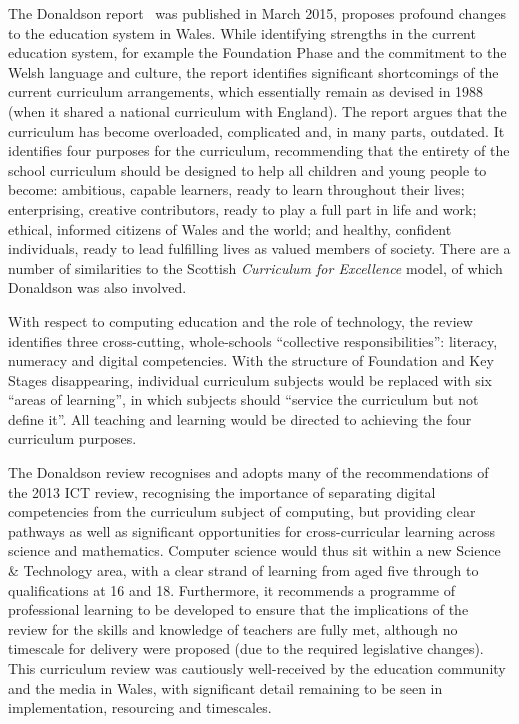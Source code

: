 \documentclass[conference]{IEEEtran}
\begin{document}
The Donaldson report~\cite{Donaldson:2015} was published in March 2015, proposes
profound changes to the education system in Wales. While identifying
strengths in the current education system, for example the Foundation
Phase and the commitment to the Welsh language and culture, the report
identifies significant shortcomings of the current curriculum
arrangements, which essentially remain as devised in 1988 (when it
shared a national curriculum with England). The report argues that the
curriculum has become overloaded, complicated and, in many parts,
outdated. It identifies four purposes for the curriculum, recommending
that the entirety of the school curriculum should be designed to help
all children and young people to become: ambitious, capable learners,
ready to learn throughout their lives; enterprising, creative
contributors, ready to play a full part in life and work; ethical,
informed citizens of Wales and the world; and healthy, confident
individuals, ready to lead fulfilling lives as valued members of
society. There are a number of similarities to the Scottish
{\emph{Curriculum for Excellence}}
model, %
of which Donaldson was also involved.

With respect to computing education and
the role of technology, the review identifies three cross-cutting,
whole-schools ``collective
responsibilities'': literacy, numeracy and digital competencies. With
the structure of Foundation and Key Stages disappearing, individual
curriculum subjects would be replaced with six ``areas of learning'',
in which subjects should ``service the curriculum but not define
it''. All teaching and learning would be directed to achieving the
four curriculum purposes.

The Donaldson review recognises and adopts many of the
recommendations of the 2013 ICT review, recognising the importance
of separating digital competencies from the curriculum subject of
computing, but providing clear pathways as well as significant
opportunities for cross-curricular learning across science and
mathematics. Computer science would thus sit within a new Science \&
Technology area, with a clear strand of learning from aged five
through to qualifications at 16 and 18. Furthermore, it recommends
a programme of professional learning to be developed to ensure that the
implications of the review for the skills and knowledge of teachers
are fully met, although no timescale for delivery were proposed (due
to the required legislative changes). This curriculum review was
cautiously well-received by the education community and the
media in Wales, with significant detail
remaining to be seen in implementation, resourcing and timescales.
\end{document}
